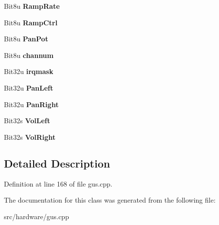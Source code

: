 \begin{DoxyCompactItemize}
\item 
\hypertarget{classGUSChannels_a795f8eff74ef91bcd3f2e56786b2ae7f}{Bit8u {\bfseries Ramp\-Rate}}\label{classGUSChannels_a795f8eff74ef91bcd3f2e56786b2ae7f}

\item 
\hypertarget{classGUSChannels_a5e53c3d380059e69241d4c2228d6b963}{Bit8u {\bfseries Ramp\-Ctrl}}\label{classGUSChannels_a5e53c3d380059e69241d4c2228d6b963}

\item 
\hypertarget{classGUSChannels_adfc57391f631967a421c68151bc8d406}{Bit8u {\bfseries Pan\-Pot}}\label{classGUSChannels_adfc57391f631967a421c68151bc8d406}

\item 
\hypertarget{classGUSChannels_ac4025f25e64fc8c0f235cdd513faf16b}{Bit8u {\bfseries channum}}\label{classGUSChannels_ac4025f25e64fc8c0f235cdd513faf16b}

\item 
\hypertarget{classGUSChannels_ab2ef78abf686814c7473539bcc197bb5}{Bit32u {\bfseries irqmask}}\label{classGUSChannels_ab2ef78abf686814c7473539bcc197bb5}

\item 
\hypertarget{classGUSChannels_a4285b8115475dff18dea76784d83ba7c}{Bit32u {\bfseries Pan\-Left}}\label{classGUSChannels_a4285b8115475dff18dea76784d83ba7c}

\item 
\hypertarget{classGUSChannels_a09b3ccc1cf8099c083e3c238ad1d8778}{Bit32u {\bfseries Pan\-Right}}\label{classGUSChannels_a09b3ccc1cf8099c083e3c238ad1d8778}

\item 
\hypertarget{classGUSChannels_a0aeb797744c172611694b90b15d50e56}{Bit32s {\bfseries Vol\-Left}}\label{classGUSChannels_a0aeb797744c172611694b90b15d50e56}

\item 
\hypertarget{classGUSChannels_a65730a7c7a5b4b64ca4519604a44b56c}{Bit32s {\bfseries Vol\-Right}}\label{classGUSChannels_a65730a7c7a5b4b64ca4519604a44b56c}

\end{DoxyCompactItemize}


\subsection{Detailed Description}


Definition at line 168 of file gus.\-cpp.



The documentation for this class was generated from the following file\-:\begin{DoxyCompactItemize}
\item 
src/hardware/gus.\-cpp\end{DoxyCompactItemize}

